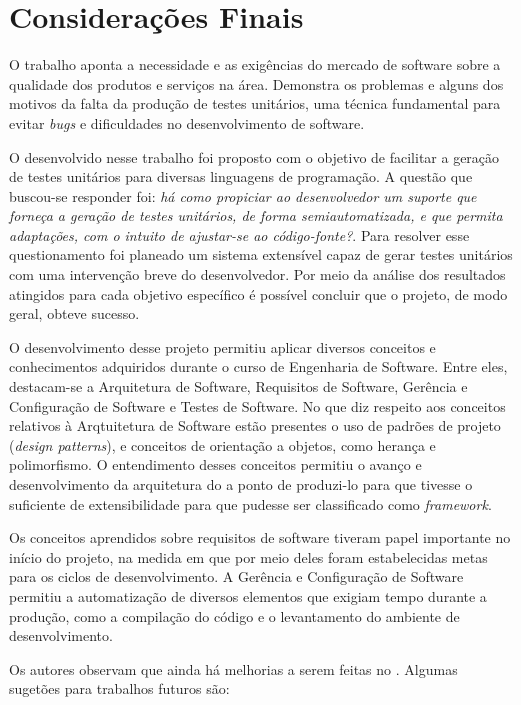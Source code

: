 \chapter[Considerações Finais]{Considerações Finais}
O trabalho aponta a necessidade e as exigências do mercado de software
sobre a qualidade dos produtos e serviços na área. Demonstra os problemas
e alguns dos motivos da falta da produção de testes unitários, uma técnica
fundamental para evitar \textit{bugs} e dificuldades no desenvolvimento
de software.

O \framework desenvolvido nesse trabalho foi proposto com o objetivo de
facilitar a geração de testes unitários para diversas linguagens de programação.
A questão que buscou-se responder foi: \textit{há como propiciar ao desenvolvedor
um suporte que forneça a geração de testes unitários, de forma
semiautomatizada, e que permita adaptações, com o intuito de ajustar-se ao
código-fonte?}. Para resolver esse questionamento foi planeado um 
sistema extensível capaz de gerar testes unitários com uma intervenção breve
do desenvolvedor. Por meio da análise dos resultados atingidos para cada objetivo
específico é possível concluir que o projeto, de modo geral, obteve sucesso. 

O desenvolvimento desse projeto permitiu aplicar diversos conceitos e conhecimentos
adquiridos durante o curso de Engenharia de Software. Entre eles, destacam-se a
Arquitetura de Software, Requisitos de Software, Gerência e Configuração de Software
e Testes de Software. No que diz respeito aos conceitos relativos à Arqtuitetura de
Software estão presentes o uso de padrões de projeto (\textit{design patterns}), e
conceitos de orientação a objetos, como herança e polimorfismo. O entendimento desses
conceitos permitiu o avanço e desenvolvimento da arquitetura do \scarefault a ponto de
produzi-lo para que tivesse o suficiente de extensibilidade para que pudesse ser classificado
como \textit{framework}.

Os conceitos aprendidos sobre  requisitos de software tiveram papel importante no início
do projeto, na medida em que por meio deles foram estabelecidas metas para os
ciclos de desenvolvimento. A Gerência e Configuração de Software permitiu a
automatização de diversos elementos que exigiam tempo durante a produção,
como a compilação do código e o levantamento do ambiente de desenvolvimento.


Os autores observam que ainda há melhorias a serem feitas no \Scarefault. Algumas
sugetões para trabalhos futuros são:

